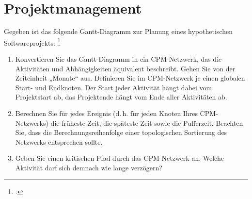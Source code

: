 \documentclass{lehramt-informatik-aufgabe}
\begin{document}
\section{Projektmanagement
}

Gegeben ist das folgende Gantt-Diagramm zur Planung eines
hypothetischen Softwareprojekts:
\footcite[Thema 2 Teilaufgabe 2 Aufgabe 1]{examen:66116:2017:09}

\begin{enumerate}


\item Konvertieren Sie das Gantt-Diagramm in ein CPM-Netzwerk, das die
Aktivitäten und Abhängigkeiten äquivalent beschreibt. Gehen Sie von der
Zeiteinheit „Monate“ aus. Definieren Sie im CPM-Netzwerk je einen
globalen Start- und Endknoten. Der Start jeder Aktivität hängt dabei vom
Projektstart ab, das Projektende hängt vom Ende aller Aktivitäten ab.


\item Berechnen Sie für jedes Ereignis (d.\,h. für jeden Knoten Ihres
CPM-Netzwerks) die früheste Zeit, die späteste Zeit sowie die
Pufferzeit. Beachten Sie, dass die Berechnungsreihenfolge einer
topologischen Sortierung des Netzwerks entsprechen sollte.


\item Geben Sie einen kritischen Pfad durch das CPM-Netzwerk an.
Welche Aktivität darf sich demnach wie lange verzögern?
\end{enumerate}
\end{document}
